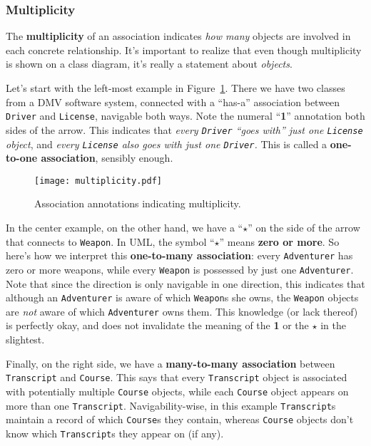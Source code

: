 \subsubsection{Multiplicity}

The \textbf{multiplicity} of an association indicates \textit{how many}
objects are involved in each concrete relationship. It's important to realize
that even though multiplicity is shown on a class diagram, it's really a
statement about \textit{objects}.

Let's start with the left-most example in Figure~\ref{fig:multiplicity}. There
we have two classes from a DMV software system, connected with a ``has-a''
association between \texttt{Driver} and \texttt{License}, navigable both ways.
Note the numeral ``\textbf{1}'' annotation both sides of the arrow. This
indicates that \textit{every \texttt{Driver} ``goes with'' just one
\texttt{License} object}, and \textit{every \texttt{License} also goes with
just one \texttt{Driver}.} This is called a \textbf{one-to-one association},
sensibly enough.

\begin{figure}[ht]
\centering
\texttt{[image: multiplicity.pdf]}   %
\caption{Association annotations indicating multiplicity.}
\label{fig:multiplicity}
\end{figure}

In the center example, on the other hand, we have a ``$\star$'' on the side of
the arrow that connects to \texttt{Weapon}. In UML, the symbol ``$\star$''
means \textbf{zero or more}. So here's how we interpret this
\textbf{one-to-many association}: every \texttt{Adventurer} has zero or more
weapons, while every \texttt{Weapon} is possessed by just one
\texttt{Adventurer}. Note that since the direction is only navigable in one
direction, this indicates that although an \texttt{Adventurer} is aware of
which \texttt{Weapon}s she owns, the \texttt{Weapon} objects are \textit{not}
aware of which \texttt{Adventurer} owns them. This knowledge (or lack thereof)
is perfectly okay, and does not invalidate the meaning of the \textbf{1} or
the $\star$ in the slightest.

Finally, on the right side, we have a \textbf{many-to-many association}
between \texttt{Tran\-script} and \texttt{Course}. This says that every
\texttt{Transcript} object is associated with potentially multiple
\texttt{Course} objects, while each \texttt{Course} object appears on more
than one \texttt{Transcript}. Navigability-wise, in this example
\texttt{Transcript}s maintain a record of which \texttt{Course}s they contain,
whereas \texttt{Course} objects don't know which \texttt{Transcript}s they
appear on (if any).

